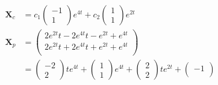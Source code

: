 \documentclass{article}
\begin{document}
\setcounter{subsubsection}{32}
\subsubsection{}

\begin{align*}
  \mathbf{X}_c    & = c_1 \begin{pmatrix}
                            -1 \\
                            1
                          \end{pmatrix} e^{4 t} + c_2 \begin{pmatrix}
                                                        1 \\
                                                        1
                                                      \end{pmatrix} e^{2 t}                                                                             \\
  \mathbf{X}_p    & = \begin{pmatrix}
                        2 e^{2 t} t - 2 e^{4 t} t - e^{2 t} + e^{4 t} \\
                        2 e^{2 t} t + 2 e^{4 t} t + e^{2 t} + e^{4 t} \\
                      \end{pmatrix}                                                                                     \\
                  & = \begin{pmatrix}
                        -2 \\
                        2
                      \end{pmatrix} t e^{4 t} + \begin{pmatrix}
                                                  1 \\
                                                  1
                                                \end{pmatrix} e^{4 t} + \begin{pmatrix}
                                                                          2 \\
                                                                          2
                                                                        \end{pmatrix} t e^{2 t} + \begin{pmatrix}
                                                                                                    -1 \\

\end{pmatrix}
\end{align*}
\end{document}
